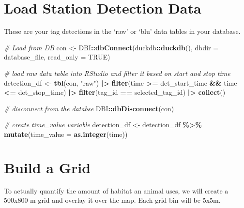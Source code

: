 \documentclass[
]{book}
\newenvironment{Shaded}{\begin{snugshade}}{\end{snugshade}}
\newcommand{\AttributeTok}[1]{\textcolor[rgb]{0.13,0.29,0.53}{#1}}
\newcommand{\CommentTok}[1]{\textcolor[rgb]{0.56,0.35,0.01}{\textit{#1}}}
\newcommand{\ConstantTok}[1]{\textcolor[rgb]{0.56,0.35,0.01}{#1}}
\newcommand{\FunctionTok}[1]{\textcolor[rgb]{0.13,0.29,0.53}{\textbf{#1}}}
\newcommand{\NormalTok}[1]{#1}
\newcommand{\OtherTok}[1]{\textcolor[rgb]{0.56,0.35,0.01}{#1}}
\newcommand{\SpecialCharTok}[1]{\textcolor[rgb]{0.81,0.36,0.00}{\textbf{#1}}}
\newcommand{\StringTok}[1]{\textcolor[rgb]{0.31,0.60,0.02}{#1}}
\begin{document}
\section{Load Station Detection Data}\label{load-station-detection-data}

These are your tag detections in the `raw' or `blu' data tables in your database.

\begin{Shaded}
\begin{Highlighting}[]
\CommentTok{\# Load from DB}
\NormalTok{con }\OtherTok{\textless{}{-}}\NormalTok{ DBI}\SpecialCharTok{::}\FunctionTok{dbConnect}\NormalTok{(duckdb}\SpecialCharTok{::}\FunctionTok{duckdb}\NormalTok{(), }
                      \AttributeTok{dbdir =}\NormalTok{ database\_file, }
                      \AttributeTok{read\_only =} \ConstantTok{TRUE}\NormalTok{)}

\CommentTok{\# load raw data table into RStudio and filter it based on start and stop time}
\NormalTok{detection\_df }\OtherTok{\textless{}{-}} \FunctionTok{tbl}\NormalTok{(con, }\StringTok{"raw"}\NormalTok{) }\SpecialCharTok{|\textgreater{}}
  \FunctionTok{filter}\NormalTok{(time }\SpecialCharTok{\textgreater{}=}\NormalTok{ det\_start\_time }\SpecialCharTok{\&\&}\NormalTok{ time }\SpecialCharTok{\textless{}=}\NormalTok{ det\_stop\_time) }\SpecialCharTok{|\textgreater{}}
  \FunctionTok{filter}\NormalTok{(tag\_id }\SpecialCharTok{==}\NormalTok{ selected\_tag\_id) }\SpecialCharTok{|\textgreater{}}
  \FunctionTok{collect}\NormalTok{()}

\CommentTok{\# disconnect from the databse}
\NormalTok{DBI}\SpecialCharTok{::}\FunctionTok{dbDisconnect}\NormalTok{(con)}

\CommentTok{\# create time\_value variable}
\NormalTok{detection\_df }\OtherTok{\textless{}{-}}\NormalTok{ detection\_df }\SpecialCharTok{\%\textgreater{}\%} 
  \FunctionTok{mutate}\NormalTok{(}\AttributeTok{time\_value =} \FunctionTok{as.integer}\NormalTok{(time))}
\end{Highlighting}
\end{Shaded}

\section{Build a Grid}\label{build-a-grid}

To actually quantify the amount of habitat an animal uses, we will create a 500x800 m grid and overlay it over the map. Each grid bin will be 5x5m.
\end{document}
